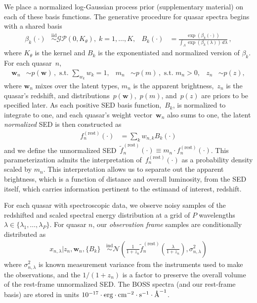 \documentclass{article} %
\begin{document}
We place a normalized log-Gaussian process prior (supplementary material) on each of these basis functions.  
The generative procedure for quasar spectra begins with a shared basis
\begin{align}
  \beta_k(\cdot) &\stackrel{\text{iid}}{\sim} \mathcal{GP}(0, K_\theta),\; k=1, \dots, K,&
  B_k(\cdot) &= \frac{\exp(\beta_k(\cdot))}{\int_\Lambda \exp(\beta_k(\lambda))\, d\lambda}   \, ,
\end{align}
where $K_{\theta}$ is the kernel and $B_k$ is the exponentiated and normalized version of $\beta_k$. For each quasar~$n$,
\begin{align}
  \mathbf{w}_n &\sim p(\mathbf{w}) \, , \text{ s.t. } \sum_{w_k} w_k = 1, &
  m_n  &\sim p(m) \, , \text{ s.t. } m_n > 0, &
  z_n &\sim p(z),
\end{align}
where $\mathbf{w}_n$ mixes over the latent types, $m_n$ is the apparent brightness,~$z_n$ is the quasar's redshift, and distributions~$p(\mathbf{w})$,~$p(m)$, and~$p(z)$ are priors to be specified later.
As each positive SED basis function,~$B_k$, is normalized to integrate to one, and each quasar's weight vector~$\mathbf{w}_n$ also sums to one, the latent \emph{normalized} SED is then constructed as
\begin{align}
  f^{(\text{rest})}_n(\cdot) &= \sum_{k} w_{n,k} B_k(\cdot)
  \label{eqn:restsed}
\end{align}
and we define the unnormalized SED~${\tilde f^{(\text{rest})}_n(\cdot) \equiv m_n \cdot f^{(\text{rest})}_n(\cdot)}$. 
This parameterization admits the interpretation of~$f^{(\text{rest})}_n(\cdot)$ as a probability density scaled by $m_n$.  
This interpretation allows us to separate out the apparent brightness, which is a function of distance and overall luminosity, from the SED itself, which carries information pertinent to the estimand of interest, redshift. 

For each quasar with spectroscopic data, we observe noisy samples of the redshifted and scaled spectral energy distribution at a grid of $P$ wavelengths ${\lambda \in \{\lambda_1, \dots, \lambda_P \}}$.
For quasar $n$, our \emph{observation frame} samples are conditionally distributed as
\begin{align}
  x_{n, \lambda} | z_n, \mathbf{w}_n, \{ B_k \} 
    &\stackrel{\textrm{ind}}{\sim} \mathcal{N}\left( \frac{1}{1 + z_n} \tilde f_n^{(\text{rest})}\left( \frac{\lambda}{1 + z_n} \right), \sigma_{n,\lambda}^2 \right)
    \label{eq:spec} 
\end{align}
where $\sigma_{n, \lambda}^2$ is known measurement variance from the instruments used to make the observations, and the $1/(1+z_n)$ is a factor to preserve the overall volume of the rest-frame unnormalized SED. 
The BOSS spectra (and our rest-frame basis) are stored in units ${10^{-17} \cdot \text{erg} \cdot \text{cm}^{-2} \cdot \text{s}^{-1} \cdot \textup{\AA}^{-1}}$.  
\end{document}
